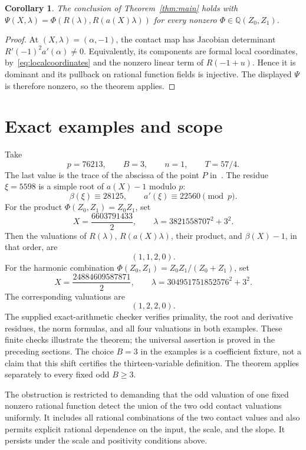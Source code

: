 \documentclass[11pt,a4paper]{article}
\newtheorem{corollary}[theorem]{Corollary}
\theoremstyle{remark}\newtheorem{remark}[theorem]{Remark}
\newcommand{\Q}{\mathbb Q}\newcommand{\Z}{\mathbb Z}
\begin{document}
\begin{corollary}\label{cor:combination}
The conclusion of Theorem~\ref{thm:main} holds with
\(\Psi(X,\lambda)=\Phi(R(\lambda),R(a(X)\lambda))\)
for every nonzero \(\Phi\in\Q(Z_0,Z_1)\).
\end{corollary}

\begin{proof}
At \((X,\lambda)=(\alpha,-1)\), the contact map has Jacobian
determinant \(R'(-1)^2a'(\alpha)\ne0\).
Equivalently, its components are formal local coordinates,
by~\eqref{eq:localcoordinates} and the nonzero linear term
of \(R(-1+u)\). Hence it is dominant and its pullback on
rational function fields is injective. The displayed
\(\Psi\) is therefore nonzero, so the theorem applies.
\end{proof}

\section{Exact examples and scope}

Take
\[
                    p=76213,\qquad B=3,\qquad n=1,\qquad T=57/4.
\]
The last value is the trace of the abscissa of the point \(P\)
in~\cite{Conditional13}. The residue \(\xi=5598\) is a simple
root of \(a(X)-1\) modulo \(p\):
\[
             \beta(\xi)\equiv28125,\qquad
             a'(\xi)\equiv22560\pmod p.
\]
For the product \(\Phi(Z_0,Z_1)=Z_0Z_1\), set
\[
             X=\frac{6603791433}{2},\qquad
             \lambda=3821558707^2+3^2.
\]
Then the valuations of \(R(\lambda)\), \(R(a(X)\lambda)\),
their product, and \(\beta(X)-1\), in that order, are
\[
                              (1,1,2,0).
\]
For the harmonic combination
\(\Phi(Z_0,Z_1)=Z_0Z_1/(Z_0+Z_1)\), set
\[
             X=\frac{24884609587871}{2},\qquad
             \lambda=304951751852576^2+3^2.
\]
The corresponding valuations are
\[
                              (1,2,2,0).
\]
The supplied exact-arithmetic checker verifies primality,
the root and derivative residues, the norm formulas, and all
four valuations in both examples. These finite checks
illustrate the theorem; the universal assertion is proved
in the preceding sections. The choice \(B=3\) in the examples
is a coefficient fixture, not a claim that this shift certifies
the thirteen-variable definition. The theorem applies separately
to every fixed odd \(B\ge3\).

The obstruction is restricted to demanding that the odd
valuation of one fixed nonzero rational function detect the
union of the two odd contact valuations uniformly. It includes
all rational combinations of the two contact values and also
permits explicit rational dependence on the input, the scale,
and the slope. It persists under the scale and positivity
conditions above.
\end{document}
